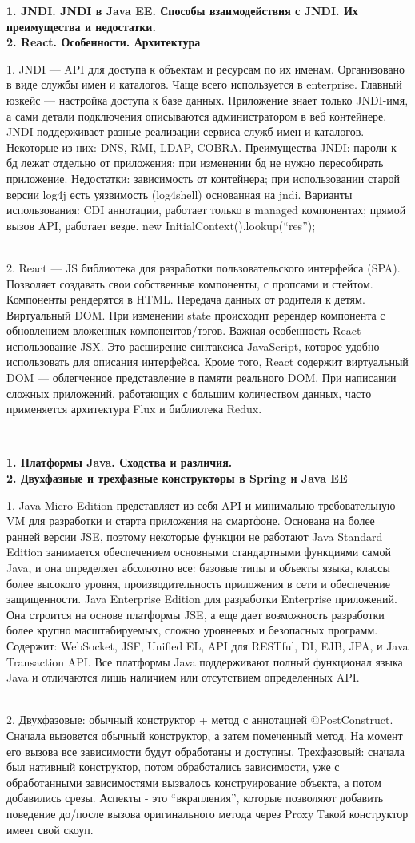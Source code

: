 \documentclass{article}
\newcommand{\bil}[4]{%
    \begin{minipage}{.3\textwidth}
        \textbf{1. #1} \\
        \textbf{2. #2}

        1. #3
        \\
        2. #4
    \end{minipage}
}
\begin{document}
\bil{JNDI. JNDI в Java EE. Способы взаимодействия с JNDI. Их преимущества и недостатки.}{React. Особенности. Архитектура}{
    JNDI — API для доступа к объектам и ресурсам по их именам. Организовано в виде службы имен и каталогов.
    Чаще всего используется в enterprise. Главный юзкейс — настройка доступа к базе данных. Приложение знает только JNDI-имя, а сами детали подключения описываются администратором в веб контейнере.
    JNDI поддерживает разные реализации сервиса служб имен и каталогов. Некоторые из них: DNS, RMI, LDAP, COBRA. 
    Преимущества JNDI: пароли к бд лежат отдельно от приложения; при изменении бд не нужно пересобирать приложение.
    Недостатки: зависимость от контейнера; при использовании старой версии log4j есть уязвимость (log4shell) основанная на jndi.
    Варианты использования: CDI аннотации, работает только в managed компонентах; прямой вызов API, работает везде. new InitialContext().lookup(“res”);
}{
    React — JS библиотека для разработки пользовательского интерфейса (SPA). Позволяет создавать свои собственные компоненты, с пропсами и стейтом. Компоненты рендерятся в HTML.
    Передача данных от родителя к детям. Виртуальный DOM. При изменении state происходит ререндер компонента с обновлением вложенных компонентов/тэгов.
    Важная особенность React — использование JSX. Это расширение синтаксиса JavaScript, которое удобно использовать для описания интерфейса.
    Кроме того, React содержит виртуальный DOM — облегченное представление в памяти реального DOM.
    При написании сложных приложений, работающих с большим количеством данных, часто применяется архитектура Flux и библиотека Redux.
}
\\
\bil{Платформы Java. Сходства и различия.}{Двухфазные и трехфазные конструкторы в Spring и Java EE}{
    Java Micro Edition представляет из себя API и минимально требовательную VM для разработки и старта приложения на смартфоне. Основана на более ранней версии JSE, поэтому некоторые функции не работают
    Java Standard Edition занимается обеспечением основными стандартными функциями самой Java, и она определяет абсолютно все: базовые типы и объекты языка, классы более высокого уровня, производительность приложения в сети и обеспечение защищенности.
    Java Enterprise Edition для разработки Enterprise приложений. Она строится на основе платформы JSE, а еще дает возможность разработки более крупно масштабируемых, сложно уровневых и безопасных программ. Содержит: WebSocket, JSF, Unified EL, API для RESTful, DI, EJB, JPA, и Java Transaction API.
    Все платформы Java поддерживают полный функционал языка Java и отличаются лишь наличием или отсутствием определенных API.
}{
    Двухфазовые: обычный конструктор + метод с аннотацией @PostConstruct. 
    Сначала вызовется обычный конструктор, а затем помеченный метод. 
    На момент его вызова все зависимости будут обработаны и доступны.
    Трехфазовый: сначала был нативный конструктор, потом обработались зависимости, уже с обработанными зависимостями вызвалось конструирование объекта, а потом добавились срезы. 
    Аспекты - это “вкрапления”, которые позволяют добавить поведение до/после вызова оригинального метода через Proxy
    Такой конструктор имеет свой скоуп.
}
\end{document}
